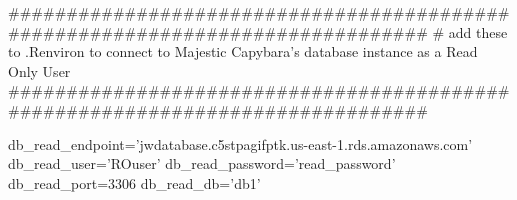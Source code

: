 ###############################################################################
# add these to .Renviron to connect to Majestic Capybara's database instance as a Read Only User
###############################################################################

db_read_endpoint='jwdatabase.c5stpagifptk.us-east-1.rds.amazonaws.com'
db_read_user='ROuser'
db_read_password='read_password'
db_read_port=3306
db_read_db='db1'